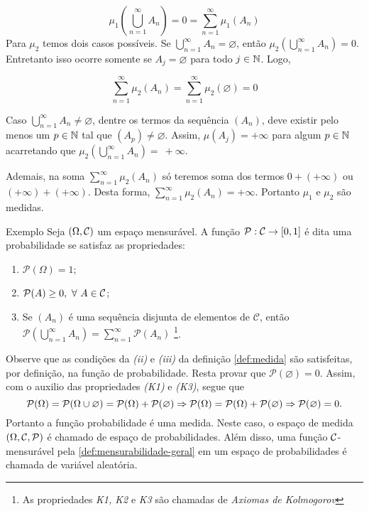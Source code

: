 $$\mu_1\left(\bigcup_{n = 1}^\infty A_n\right) = 0 = \sum_{n = 1}^\infty \mu_1(A_n) $$
Para $\mu_2$ temos dois casos possíveis.
Se  $\displaystyle \bigcup_{n = 1}^\infty A_n  = \varnothing$, então $\mu_2\left(\displaystyle \bigcup_{n = 1}^\infty A_n\right) = 0$. Entretanto isso ocorre somente se $A_j = \varnothing$ para todo $j \in \operatorname{\mathbb{N}}$.
Logo, 

$$\sum_{n = 1}^\infty \mu_2(A_n) = \sum_{n = 1}^\infty \mu_2(\varnothing) = 0$$

Caso $\displaystyle \bigcup_{n = 1}^\infty A_n  \neq  \varnothing$, dentre os termos da sequência $(A_n)$, deve existir pelo menos um $p \in \operatorname{\mathbb{N}}$ tal que $(A_p) \neq \varnothing$.
Assim, $\mu(A_j) = +\infty$ para algum $p \in \operatorname{\mathbb{N}}$ acarretando que  $\mu_2\left(\displaystyle \bigcup_{n = 1}^\infty A_n\right) =~+\infty$.

Ademais, na soma $\displaystyle \sum_{n = 1}^\infty \mu_2(A_n)$ só teremos soma dos termos $0 + (+ \infty)$ ou $(+\infty) + (+\infty)$.
Desta forma, $\displaystyle \sum_{n = 1}^\infty \mu_2(A_n) = +\infty$.
Portanto $\mu_1$ e $\mu_2$ são medidas.

\begin{env}{Exemplo}
	Seja $(\Omega, \operatorname{\mathcal{C}})$ um espaço mensurável.
	A função $\mathcal{P}:\operatorname{\mathcal{C}} \to [0,1]$ é dita uma probabilidade se satisfaz as propriedades:
	\begin{enumerate}[label* =(K\arabic*)]
		\item $\mathcal{P}(\Omega) = 1$;
		\item $\mathcal{P}(A) \geq 0,\ \forall\  A \in \operatorname{\mathcal{C}}$;
		\item Se $(A_n)$ é uma sequência disjunta de elementos de  $\mathcal{C}$, então 
		$\displaystyle\mathcal{P}\left(\bigcup_{n = 1}^\infty A_n\right) = \sum_{n = 1}^\infty\mathcal{P}(A_n)$
		\footnote{As propriedades \textit{K1, K2} e \textit{K3} são chamadas de \textit{Axiomas de Kolmogorov}}.
	\end{enumerate}
\end{env}

Observe que as condições da \textit{(ii)} e \textit{(iii)} da definição \ref{def:medida} são satisfeitas, por definição, na função de probabilidade.
Resta provar que $\mathcal{P}(\varnothing) = 0$.
Assim, com o auxilio das propriedades \textit{(K1)} e \textit{(K3)}, segue que 
$$
\operatorname{\mathcal{P}}(\Omega)
= 
\operatorname{\mathcal{P}}(\Omega \cup \varnothing)
= 
\operatorname{\mathcal{P}}(\Omega) + \operatorname{\mathcal{P}}(\varnothing)
\Rightarrow
\operatorname{\mathcal{P}}(\Omega)
= 
\operatorname{\mathcal{P}}(\Omega) + \operatorname{\mathcal{P}}(\varnothing)
\Rightarrow
\operatorname{\mathcal{P}}(\varnothing) = 0.
$$
Portanto a função probabilidade é uma medida.
Neste caso, o espaço de medida $(\Omega, \operatorname{\mathcal{C}}, \operatorname{\mathcal{P}})$ é chamado de espaço de probabilidades.
Além disso, uma função $\operatorname{\mathcal{C}}$-mensurável pela \ref{def:mensurabilidade-geral} em um espaço de probabilidades é chamada de variável aleatória.

